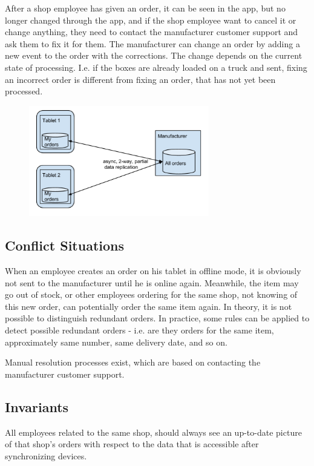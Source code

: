 \documentclass[11pt,a4paper]{report}
\begin{document}
After a shop employee has given an order, it can be seen in the app, but no longer changed through the app, and if the shop employee want to cancel it or change anything, they need to contact the manufacturer customer support and ask them to fix it for them. The manufacturer can change an order by adding a new event to the order with the corrections. The change depends on the current state of processing. I.e. if the boxes are already loaded on a truck and sent, fixing an incorrect order is different from fixing an order, that has not yet been processed.
\begin{figure}[!h]
\centering
\includegraphics[width=0.7\textwidth]{./img/image5.png}
\end{figure}

\subsection{Conflict Situations}

When an employee creates an order on his tablet in offline mode, it is obviously not sent to the manufacturer until he is online again. Meanwhile, the item may go out of stock, or other employees ordering for the same shop, not knowing of this new order, can potentially order the same item again.
In theory, it is not possible to distinguish redundant orders. In practice, some rules can be applied to detect possible redundant orders - i.e. are they orders for the same item, approximately same number, same delivery date, and so on.

Manual resolution processes exist, which are based on contacting the manufacturer customer support.

\subsection{Invariants}
All employees related to the same shop, should always see an up-to-date picture of that shop's orders with respect to the data that is accessible after synchronizing devices.
\end{document}
